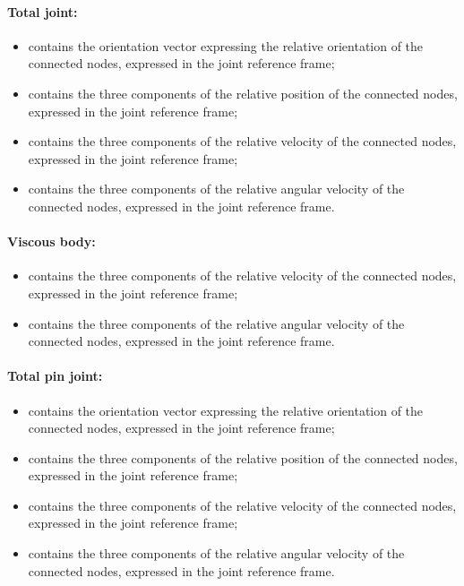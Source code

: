 \paragraph{Total joint:}
\begin{itemize}
\item {} contains the orientation vector
  expressing the relative orientation of the connected nodes, expressed in 
  the joint reference frame;
\item {} contains the three components of
  the relative position of the connected nodes, expressed in the joint 
  reference frame;
\item {} contains the three components of
  the relative velocity of the connected nodes, expressed in the joint 
  reference frame;
\item {} contains the three components
  of the relative angular velocity of the connected nodes, expressed in 
  the joint reference frame.
\end{itemize}

\paragraph{Viscous body:}
\begin{itemize}
\item {} contains the three components of
  the relative velocity of the connected nodes, expressed in the joint 
  reference frame;
\item {} contains the three components
  of the relative angular velocity of the connected nodes, expressed in 
  the joint reference frame.
\end{itemize}



\paragraph{Total pin joint:}
\begin{itemize}
\item {} contains the orientation vector
  expressing the relative orientation of the connected nodes, expressed in 
  the joint reference frame;
\item {} contains the three components of
  the relative position of the connected nodes, expressed in the joint 
  reference frame;
\item {} contains the three components of
  the relative velocity of the connected nodes, expressed in the joint 
  reference frame;
\item {} contains the three components
  of the relative angular velocity of the connected nodes, expressed in 
  the joint reference frame.
\end{itemize}


